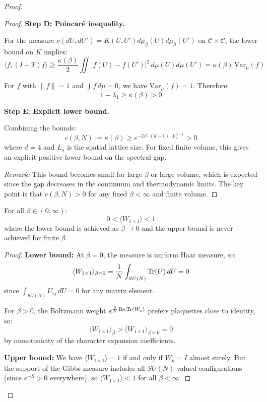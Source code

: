 \begin{proof}
\begin{proof}
\textbf{Step D: Poincar\'e inequality.}

For the measure $\nu(dU, dU') = K(U, U') d\mu_\beta(U) d\mu_\beta(U')$ on 
$\mathcal{C} \times \mathcal{C}$, the lower bound on $K$ implies:
\[
\langle f, (I - T) f \rangle \geq \frac{\kappa(\beta)}{2} \iint |f(U) - f(U')|^2 \, d\mu(U) d\mu(U')
= \kappa(\beta) \, \text{Var}_\mu(f)
\]

For $f$ with $\|f\| = 1$ and $\int f \, d\mu = 0$, we have $\text{Var}_\mu(f) = 1$.
Therefore:
\[
1 - \lambda_1 \geq \kappa(\beta) > 0
\]

\textbf{Step E: Explicit lower bound.}

Combining the bounds:
\[
c(\beta, N) := \kappa(\beta) \geq e^{-2\beta \cdot (d-1) \cdot L_s^{d-1}} > 0
\]
where $d = 4$ and $L_s$ is the spatial lattice size. For fixed finite volume, 
this gives an explicit positive lower bound on the spectral gap.

\textit{Remark:} This bound becomes small for large $\beta$ or large volume, 
which is expected since the gap decreases in the continuum and thermodynamic limits. 
The key point is that $c(\beta, N) > 0$ for any fixed $\beta < \infty$ and finite volume.
\end{proof}

\begin{lemma}
\label{lem:plaquette-all-beta}
For all $\beta \in (0, \infty)$:
\[
0 < \langle W_{1 \times 1} \rangle < 1
\]
where the lower bound is achieved as $\beta \to 0$ and the upper bound is 
never achieved for finite $\beta$.
\end{lemma}

\begin{proof}
\textbf{Lower bound:} At $\beta = 0$, the measure is uniform Haar measure, so:
\[
\langle W_{1 \times 1} \rangle_{\beta=0} = \frac{1}{N}\int_{SU(N)} \operatorname{Tr}(U) \, dU = 0
\]
since $\int_{SU(N)} U_{ij} \, dU = 0$ for any matrix element.

For $\beta > 0$, the Boltzmann weight $e^{\frac{\beta}{N}\operatorname{Re}\operatorname{Tr}(W_p)}$ prefers 
plaquettes close to identity, so:
\[
\langle W_{1 \times 1} \rangle_\beta > \langle W_{1 \times 1} \rangle_{\beta=0} = 0
\]
by monotonicity of the character expansion coefficients.

\textbf{Upper bound:} We have $\langle W_{1 \times 1} \rangle = 1$ if and only 
if $W_p = I$ almost surely. But the support of the Gibbs measure includes 
all $SU(N)$-valued configurations (since $e^{-S} > 0$ everywhere), so 
$\langle W_{1 \times 1} \rangle < 1$ for all $\beta < \infty$.


\end{proof}
\end{proof}
